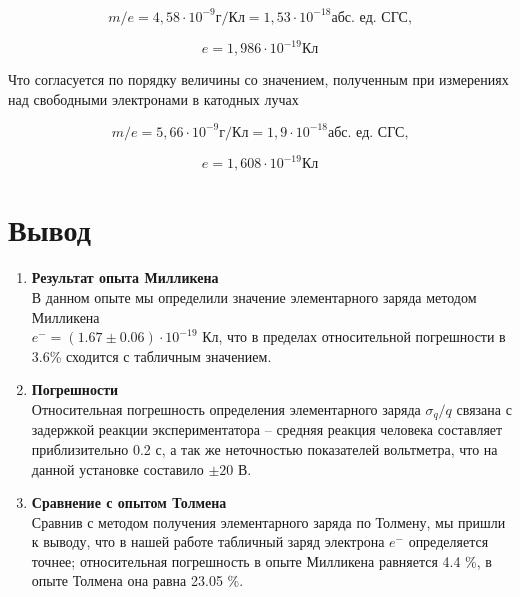 \documentclass{lab}
\begin{document}
\begin{equation}
	m/e = 4,58 \cdot 10^{-9} \text{г/Кл} = 1,53 \cdot 10^{-18} \text{абс. ед. СГС,}
\end{equation}

\begin{equation}
	e = 1,986\cdot 10^{-19} \text{Кл}
\end{equation}

Что согласуется по порядку величины со значением, полученным при измерениях над свободными электронами в катодных лучах

\begin{equation}
	m/e = 5,66 \cdot 10^{-9} \text{г/Кл}  = 1,9 \cdot 10^{-18} \text{абс. ед. СГС,}
\end{equation}

\begin{equation}
	e = 1,608\cdot 10^{-19} \text{Кл}
\end{equation}

\section{Вывод}
\begin{enumerate}
	\item \textbf{Результат опыта Милликена}
	      \\
	      В данном опыте мы определили значение элементарного заряда методом Милликена \\ $e^{-} = (1.67 \pm 0.06)\cdot10^{-19} \text{ Кл}$, что в пределах относительной погрешности в 3.6\% сходится с табличным значением.
	\item \textbf{Погрешности}
	      \\
	      Относительная погрешность определения элементарного заряда $\sigma_q/q$ связана с задержкой реакции экспериментатора -- средняя реакция человека составляет приблизительно 0.2 с, а так же неточностью показателей вольтметра, что на данной установке составило $\pm 20 \text{ В}$.
	\item \textbf{Сравнение с опытом Толмена}
	      \\
	      Сравнив с методом получения элементарного заряда по Толмену, мы пришли к выводу, что в нашей работе табличный заряд электрона $e^{-}$ определяется точнее; относительная погрешность в опыте Милликена равняется 4.4 \%, в опыте Толмена она равна 23.05 \%.
\end{enumerate}
\end{document}

